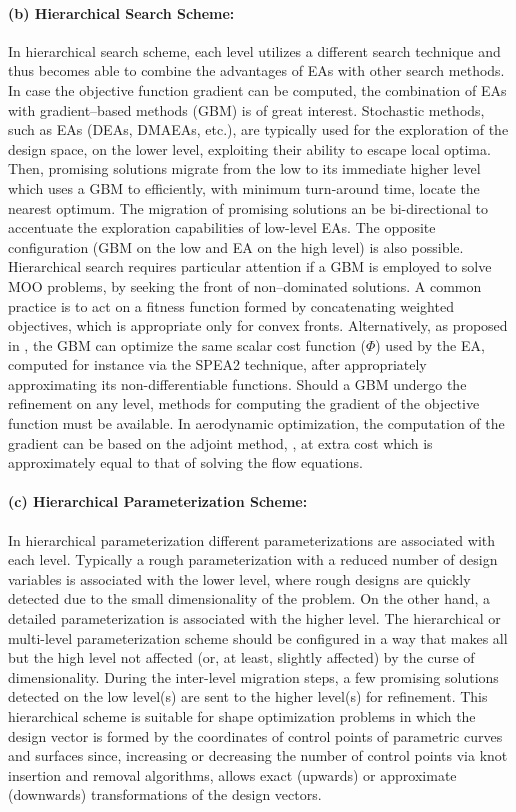 \paragraph{(b) Hierarchical Search Scheme:}
In hierarchical search scheme, each level utilizes a different search technique and thus becomes able to combine the advantages of EAs with other search methods. In case the objective function gradient can be computed, the combination of EAs with gradient–based methods (GBM) is of great interest. Stochastic methods, such as EAs (DEAs, DMAEAs, etc.), are typically used for the exploration of the design space, on the lower level, exploiting their ability to escape local optima. Then, promising solutions migrate from the low to its immediate higher level which uses a GBM to efficiently, with minimum turn-around time, locate the nearest optimum. The migration of promising solutions an be bi-directional to accentuate the exploration capabilities of low-level EAs. The opposite configuration (GBM on the low and EA on the high level) is also possible. Hierarchical search requires particular attention if a GBM is employed to solve MOO problems, by seeking the front of non–dominated solutions. A common practice is to act on a fitness function formed by concatenating weighted objectives, which is appropriate only for convex fronts. Alternatively, as proposed in \cite{LTT_2_036}, the GBM can optimize the same scalar cost function ($\Phi$) used by the EA, computed for instance via the SPEA2 technique, after appropriately approximating its non-differentiable functions. Should a GBM undergo the refinement on any level, methods for computing the gradient of the objective function must be available. In aerodynamic optimization, the computation of the gradient can be based on the adjoint method, \cite{LTT_2_032}, at extra cost which is approximately equal to that of solving the flow equations.


\paragraph{(c) Hierarchical Parameterization Scheme:}
In hierarchical parameterization different parameterizations are  associated with each level. Typically a rough parameterization with a reduced number of design variables is associated with the lower level, where rough designs are quickly detected due to the small dimensionality of the problem. On the other hand, a detailed parameterization is associated with the higher level.  The hierarchical or multi-level parameterization scheme should be configured in a way that makes all but the high level not affected (or, at least, slightly affected) by the curse of dimensionality. During the inter-level migration steps, a few promising solutions detected on the low level(s) are sent to the higher level(s) for refinement. This hierarchical scheme is suitable for shape optimization problems in which the design vector is formed by the coordinates of control points of parametric curves and surfaces since, increasing or decreasing the number of control points via knot insertion and removal algorithms, allows exact (upwards) or approximate (downwards) transformations of the design vectors.


